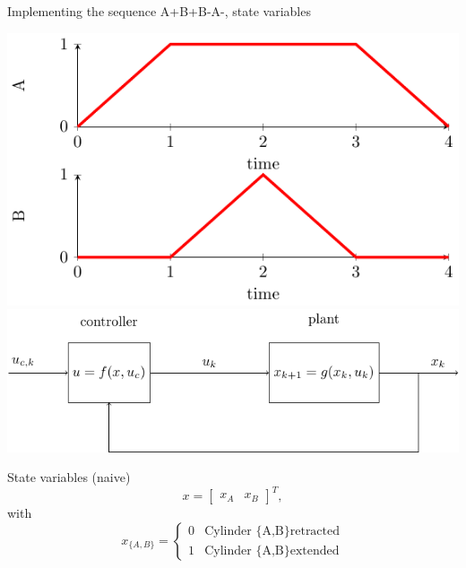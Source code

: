 \documentclass[presentation,aspectratio=1610]{beamer}
\begin{document}
\begin{frame}[label={sec:org84cd8f8}]{Implementing the sequence A+B+B-A-, state variables}
\begin{center}
\includegraphics[width=0.3\linewidth]{../../figures/AplusBplusBminAmin}
\includegraphics[width=0.68\linewidth]{../../figures/logic-control-loop}
\end{center}

\begin{block}{State variables (naive)}
\[ x = \begin{bmatrix} x_A & x_B \end{bmatrix}^T, \]
with
\[ x_{\{A,B\}} = \begin{cases} 0 & \text{Cylinder \{A,B\} retracted}\\
                               1& \text{Cylinder \{A,B\} extended}
                 \end{cases}
   \]
\end{block}
\end{frame}
\end{document}
